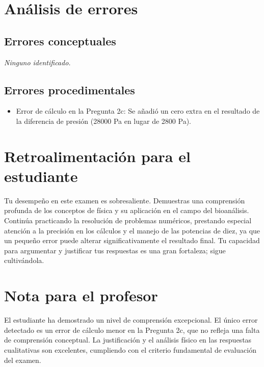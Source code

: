\documentclass[11pt,a4paper]{article}
\begin{document}
\section*{Análisis de errores}

\subsection*{Errores conceptuales}
\textit{Ninguno identificado.}

\subsection*{Errores procedimentales}
\begin{itemize}[leftmargin=1.5em, itemsep=2pt]
  \item Error de cálculo en la Pregunta 2c: Se añadió un cero extra en el resultado de la diferencia de presión (28000 Pa en lugar de 2800 Pa).
\end{itemize}

\section*{Retroalimentación para el estudiante}
\begin{tcolorbox}[cajaRecomendacion, title={Dirigido a: Johany Rojas}]
Tu desempeño en este examen es sobresaliente. Demuestras una comprensión profunda de los conceptos de física y su aplicación en el campo del bioanálisis. Continúa practicando la resolución de problemas numéricos, prestando especial atención a la precisión en los cálculos y el manejo de las potencias de diez, ya que un pequeño error puede alterar significativamente el resultado final. Tu capacidad para argumentar y justificar tus respuestas es una gran fortaleza; sigue cultivándola.
\end{tcolorbox}

\section*{Nota para el profesor}
\begin{tcolorbox}[
  enhanced, breakable,
  colback=yellow!8, colframe=yellow!60!black,
  fonttitle=\bfseries, coltitle=black,
  title={Observaciones para revisión manual},
  top=4pt, bottom=4pt, left=8pt, right=8pt,
]
El estudiante ha demostrado un nivel de comprensión excepcional. El único error detectado es un error de cálculo menor en la Pregunta 2c, que no refleja una falta de comprensión conceptual. La justificación y el análisis físico en las respuestas cualitativas son excelentes, cumpliendo con el criterio fundamental de evaluación del examen.
\end{tcolorbox}
\end{document}

